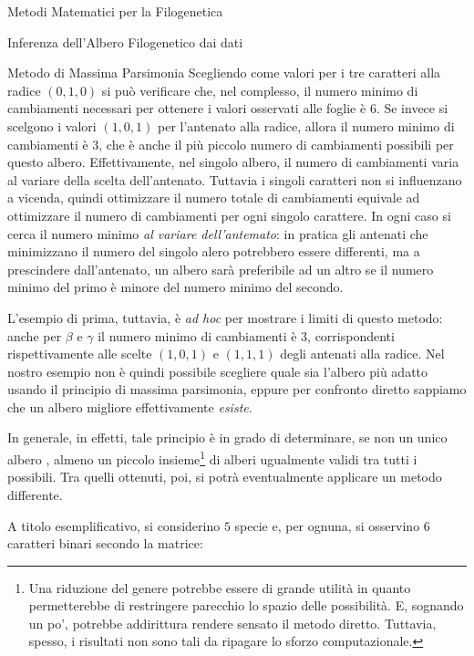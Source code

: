 \documentclass{article}
\begin{document}
\begin{section}{Metodi Matematici per la Filogenetica}
\begin{subsection}{Inferenza dell’Albero Filogenetico dai dati}
\begin{subsubsection}{Metodo di Massima Parsimonia}
				Scegliendo come valori per i tre caratteri alla radice $(0, 1, 0)$ si può verificare che, nel complesso, il numero minimo di cambiamenti necessari per ottenere i valori osservati alle foglie è $6$. Se invece si scelgono i valori $(1, 0, 1)$ per l'antenato alla radice, allora il numero minimo di cambiamenti è $3$, che è anche il più piccolo numero di cambiamenti possibili per questo albero. Effettivamente, nel singolo albero, il numero di cambiamenti varia al variare della scelta dell'antenato. Tuttavia i singoli caratteri non si influenzano a vicenda, quindi ottimizzare il numero totale di cambiamenti equivale ad ottimizzare il numero di cambiamenti per ogni singolo carattere. In ogni caso si cerca il numero minimo \emph{al variare dell'antemato}: in pratica gli antenati che minimizzano il numero del singolo alero potrebbero essere differenti, ma a prescindere dall'antenato, un albero sarà preferibile ad un altro se il numero minimo del primo è minore del numero minimo del secondo.
				
				L'esempio di prima, tuttavia, è \emph{ad hoc} per mostrare i limiti di questo metodo: anche per $\beta$ e $\gamma$ il numero minimo di cambiamenti è $3$, corrispondenti rispettivamente alle scelte $(1, 0, 1)$ e $(1, 1, 1)$ degli antenati alla radice. Nel nostro esempio non è quindi possibile scegliere quale sia l’albero più adatto usando il principio di massima parsimonia, eppure per confronto diretto sappiamo che un albero migliore effettivamente \emph{esiste}.
				
				In generale, in effetti, tale principio è in grado di determinare, se non un unico albero , almeno un piccolo insieme\footnote{Una riduzione del genere potrebbe essere di grande utilità in quanto permetterebbe di restringere parecchio lo spazio delle possibilità. E, sognando un po', potrebbe addirittura rendere sensato il metodo diretto. Tuttavia, spesso, i risultati non sono tali da ripagare lo sforzo computazionale.} di alberi ugualmente validi tra tutti i possibili. Tra quelli ottenuti, poi, si potrà eventualmente applicare un metodo differente. \par
				
				A titolo esemplificativo, si considerino $5$ specie e, per ognuna, si osservino $6$ caratteri binari secondo la matrice:
				

\end{subsubsection}
\end{subsection}
\end{section}
\end{document}
